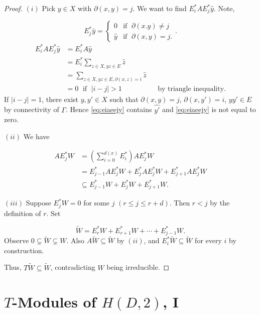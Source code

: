 \documentclass[
]{book}
\theoremstyle{definition}
\theoremstyle{definition}
\theoremstyle{definition}
\theoremstyle{definition}
\theoremstyle{remark}
\begin{document}
\begin{proof}
\leavevmode

\((i)\) Pick \(y\in X\) with \(\partial(x,y) = j\). We want to find \(E_i^*AE^*_j \hat{y}\). Note,

\[E_j^*\hat{y} = \begin{cases} 0 & \text{if }\; \partial(x.y)\neq j\\
\hat{y} & \text{if }\; \partial(x,y) = j.\end{cases}.\]
\begin{align}
E_i^*AE_j^*\hat{y} &= E_i^*A\hat{y} \\
& = E_i^*\sum_{z\in X, yz\in E}\hat{z}\\
& = \sum_{z\in X, yz\in E, \partial(x, z) = i}\hat{z}  \label{eq:eiaeejy}\\
& = 0 \; \text{ if }\; |i-j|>1 && \text{by triangle inequality.}
\end{align}
If \(|i-j| = 1\), there exist \(y, y'\in X\) such that \(\partial(x,y) = j\), \(\partial(x,y') = i\), \(yy'\in E\) by connectivity of \(\Gamma\). Hence
\eqref{eq:eiaeejy} contains \(\widehat{y'}\) and \eqref{eq:eiaeejy} is not equal to zero.

\((ii)\) We have

\begin{align}
AE_j^*W & = \left(\sum_{i=0}^{d(x)}E_i^*\right)AE_j^*W\\
& = E_{j-1}^*AE^*_jW + E^*_jAE_j^*W + E^*_{j+1}AE_j^*W\\
& \subseteq E^*_{j-1}W + E^*_jW + E^*_{j+1}W.
\end{align}

\((iii)\) Suppose \(E_j^*W = 0\) for some \(j\) \((r\leq j \leq r+d)\). Then \(r < j\) by the definition of \(r\). Set

\[\widetilde{W} = E^*_rW + E^*_{r+1}W + \cdots + E^*_{j-1}W.\]
Observe \(0\subsetneq \widetilde{W} \subsetneq W\).
Also \(A\widetilde{W} \subseteq \widetilde{W}\) by \((ii)\), and \(E_i^*\widetilde{W} \subseteq \widetilde{W}\) for every \(i\) by construction.

Thus, \(T\widetilde{W} \subseteq \widetilde{W}\), contradicting \(W\) being irreducible.

\end{proof}

\hypertarget{lec5}{%
\chapter{\texorpdfstring{\(T\)-Modules of \(H(D,2)\), I}{T-Modules of H(D,2), I}}\label{lec5}}
\end{document}
